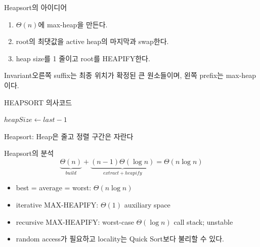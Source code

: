 \begin{frame}{Heapsort의 아이디어}
\begin{enumerate}\item $\Theta(n)$에 max-heap을 만든다.\item root의 최댓값을 active heap의 마지막과 swap한다.\item heap size를 1 줄이고 root를 HEAPIFY한다.\end{enumerate}
\begin{block}{Invariant}오른쪽 suffix는 최종 위치가 확정된 큰 원소들이며, 왼쪽 prefix는 max-heap이다.\end{block}
\end{frame}
\begin{frame}{HEAPSORT 의사코드}
\begin{algorithmic}[1]\State {}\State {}\State $heapSize\gets last-1$\State {}\EndFor\EndProcedure\end{algorithmic}
\end{frame}
\begin{frame}{Heapsort: Heap은 줄고 정렬 구간은 자란다}
\centering{}
\end{frame}
\begin{frame}{Heapsort의 분석}
\[\underbrace{\Theta(n)}_{build}+\underbrace{(n-1)\Theta(\log n)}_{extract+heapify}=\Theta(n\log n)\]
\begin{itemize}\item best = average = worst: $\Theta(n\log n)$\item iterative MAX-HEAPIFY: $\Theta(1)$ auxiliary space\item recursive MAX-HEAPIFY: worst-case $\Theta(\log n)$ call stack; unstable\item random access가 필요하고 locality는 Quick Sort보다 불리할 수 있다.\end{itemize}
\end{frame}
